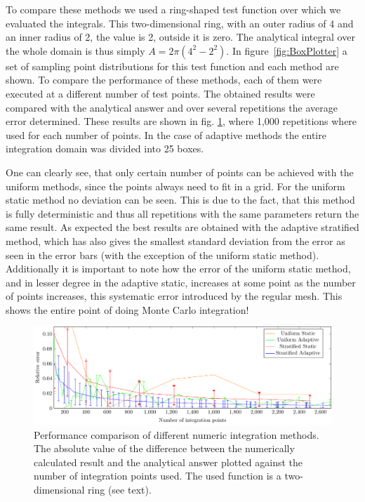 To compare these methods we used a ring-shaped test function over which we evaluated the integrals. This two-dimensional ring, with an outer radius of 4 and an inner radius of 2, the value is 2, outside it is zero. The analytical integral over the whole domain is thus simply $ A=2\pi (4^2-2^2)$.  In figure~\ref{fig:BoxPlotter} a set of sampling point distributions for this test function and each method are shown. To compare the performance of these methods, each of them were executed at a different number of test points. The obtained results were compared with the analytical answer and over several repetitions the average error determined. These results are shown in fig. \ref{fig:MCerrs}, where 1,000 repetitions where used for each number of points. In the case of adaptive methods the entire integration domain was divided into 25 boxes.

One can clearly see, that only certain number of points can be achieved with the uniform methods, since the points always need to fit in a grid. For the uniform static method no deviation can be seen. This is due to the fact, that this method is fully deterministic and thus all repetitions with the same parameters return the same result.
As expected the best results are obtained with the adaptive stratified method, which has also gives the smallest standard deviation from the error as seen in the error bars (with the exception of the uniform static method).
Additionally it is important to note how the error of the uniform static method, and in lesser degree in the adaptive static, increases at some point as the number of points increases, this systematic error introduced by the regular mesh. This shows the entire point of doing Monte Carlo integration!
\begin{figure}[th]
  \begin{center}
  \includegraphics[scale=0.9]{graphs/integration_test_ring.pdf}
  \caption{Performance comparison of different numeric integration methods. The absolute value of the difference between the numerically calculated result and the analytical answer plotted against the number of integration points used. The used function is a two-dimensional ring (see text).}
  \label{fig:MCerrs}
  \end{center}
\end{figure}
